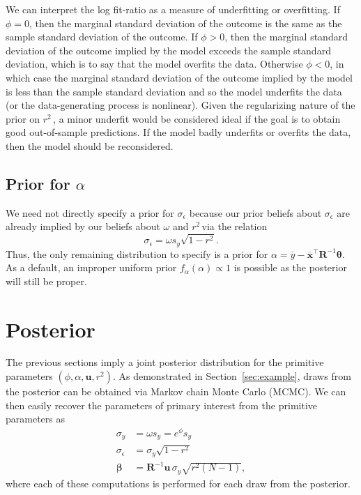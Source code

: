 \documentclass[11pt]{article}
\newcommand{\Rsq}{$r^2\,$}
\newcommand{\boldbeta}{\boldsymbol{\beta}}
\newcommand{\boldtheta}{\boldsymbol{\theta}}
\newcommand{\sigmaEps}{\sigma_{\epsilon}}
\newcommand{\R}{\mathbf{R}}
\renewcommand{\u}{\mathbf{u}}
\begin{document}
We can interpret the log fit-ratio as a measure of underfitting or overfitting.
If $\phi = 0$, then the marginal standard deviation of the outcome is the same
as the sample standard deviation of the outcome. If $\phi > 0$, then the
marginal standard deviation of the outcome implied by the model exceeds the
sample standard deviation, which is to say that the model overfits the data.
Otherwise $\phi < 0$, in which case the marginal standard deviation of the
outcome implied by the model is less than the sample standard deviation and so
the model underfits the data (or the data-generating process is nonlinear).
Given the regularizing nature of the prior on \Rsq, a minor underfit would be
considered ideal if the goal is to obtain good out-of-sample predictions. If the
model badly underfits or overfits the data, then the model should be
reconsidered.

\subsection{Prior for $\alpha$}
We need not directly specify a prior for $\sigmaEps$ because our prior beliefs
about $\sigmaEps$ are already implied by our beliefs about $\omega$ and \Rsq via
the relation
$$\sigmaEps = \omega s_y \sqrt{1 - r^2}.$$
Thus, the only remaining distribution to specify is a prior for
$\alpha = \overline{y} - \overline{\mathbf{x}}^\top \R^{-1} \boldtheta$.
As a default, an improper uniform prior $f_\alpha(\alpha) \propto 1$ is possible
as the posterior will still be proper.

\section{Posterior}
\label{sec:posterior}

The previous sections imply a joint posterior distribution for the primitive
parameters $\left(\phi, \alpha, \u, r^2 \right)$. As demonstrated in
Section~\ref{sec:example}, draws from the posterior can be obtained via Markov
chain Monte Carlo (MCMC). We can then easily recover the parameters of primary
interest from the primitive parameters as
%
\begin{align*}
\sigma_y &= \omega s_y = e^\phi s_y \\
\sigmaEps &= \sigma_y \sqrt{1 - r^2} \\
\boldbeta &= \R^{-1} \u \, \sigma_y \sqrt{r^2 \left(N-1\right)},
\end{align*}
%
where each of these computations is performed for each draw from the posterior.
\end{document}
